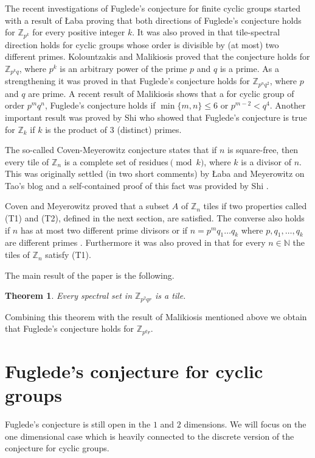 \documentclass[10pt]{article}
\newcommand{\N}{\mathbb{N}}
\newcommand{\Z}{\mathbb{Z}}
\newtheorem{Thme}{Theorem}[section]
\begin{document}
        The recent investigations of Fuglede's conjecture for finite cyclic groups started with a result of \L aba \cite{laba} proving that both directions of Fuglede's conjecture holds for $\mathbb{Z}_{p^k}$ for every positive integer $k$. It was also proved in \cite{laba} that tile-spectral direction holds for cyclic groups whose order is divisible by (at most) two different primes.
        Kolountzakis and Malikiosis \cite{Kol} proved that the conjecture holds for $\Z_{p^k q}$, where $p^k$ is an arbitrary power of the prime $p$ and $q$ is a prime. As a strengthening it was proved in \cite{negyen} that Fuglede's conjecture holds for $\Z_{p^nq^2}$, where $p$ and $q$ are prime. A recent result of Malikiosis shows that a for cyclic group of order $p^mq^n$, Fuglede's conjecture holds if $ \min \{m,n \} \le 6$ or $p^{m-2}<q^4$.
        Another important result was proved by Shi \cite{shi} who showed that Fuglede's conjecture is true for $\Z_k$ if $k$ is the product of $3$ (distinct) primes. 
        
        The so-called Coven-Meyerowitz conjecture states that if $n$ is square-free, then every tile of $\Z_n$ is a complete set of residues$\pmod{k}$, where $k$ is a divisor of $n$. This was originally settled (in two short comments) by \L aba and Meyerowitz on Tao's blog and a self-contained proof of this fact was provided by Shi \cite{shi}. 
        
        Coven and Meyerowitz \cite{cm} proved that a subset $A$ of $\Z_n$ tiles if  two properties called (T1) and (T2), defined in the next section, are satisfied. 
        The converse also holds if $n$ has at most two different prime divisors or if $n=p^m q_1 \ldots q_k$ where $p, q_1, \ldots ,q_k$ are different primes \cite{Romanos2020}. Furthermore it was also proved in \cite{cm} that for every $n \in \N$ the tiles of $\Z_n$ satisfy (T1).
        
        The main result of the paper is the following. 
        \begin{Thme}
        Every spectral set in $\Z_{p^2qr}$ is a tile. 
        \end{Thme}
        Combining this theorem with the result of Malikiosis mentioned above we obtain that Fuglede's conjecture holds for $\Z_{p^qr}$.
        \section{Fuglede's conjecture for cyclic groups}
        Fuglede's conjecture is still open in the $1$ and $2$ dimensions. We will focus on the one dimensional case which is heavily connected to the discrete version of the conjecture for cyclic groups. 
        
\end{document}
